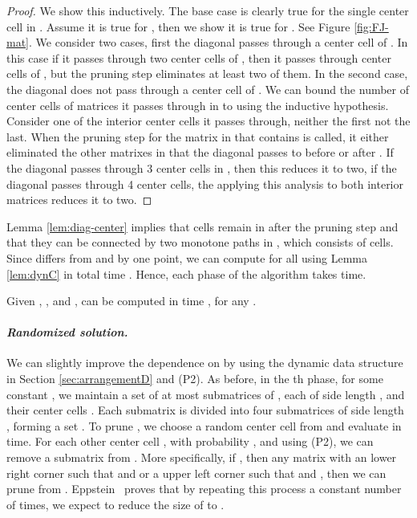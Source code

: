 \documentclass[11pt]{myclass}
\begin{document}
\begin{proof}
We show this inductively.  The base case is clearly true for the single center cell in .  
Assume it is true for , then we show it is true for .  
See Figure \ref{fig:FJ-mat}.
We consider two cases, first the diagonal passes through a center cell of .  
In this case if it passes through two center cells of , then it passes through  center cells of , but the pruning step eliminates at least two of them.  
In the second case, the diagonal does not pass through a center cell of .  We can bound the number of center cells of matrices it passes through in  to  using the inductive hypothesis.  
Consider one of the interior center cells  it passes through, neither the first not the last.  When the pruning step for the matrix in  that contains  is called, it either eliminated the other matrixes in  that the diagonal passes to before or after .  If the diagonal passes through 3 center cells in , then this reduces it to two, if the diagonal passes through 4 center cells, the applying this analysis to both interior matrices reduces it to two.  
\end{proof}

Lemma \ref{lem:diag-center} implies that  cells remain in  after the pruning step and that they can be connected by two monotone paths in , which consists of  cells.
Since  differs from  and  by one point, we can compute  for all  using 
Lemma \ref{lem:dynC} in total time .
Hence, each phase of the algorithm takes  time.  

\begin{lemma}
Given , , and , 
 can be computed in time , for any .  
\end{lemma}


\paragraph{\textbf{\emph{Randomized solution.}}}
We can slightly improve the dependence on  by using the dynamic data structure in Section \ref{sec:arrangementD} and (P2).  
As before, in the th phase, for some constant , we maintain a set  of at most  submatrices of , each of side length , and their center cells .  Each submatrix is divided into four submatrices of side length , forming a set .  To prune , we choose a random center cell  from  and evaluate  in  time.  For each other center cell ,  with probability , and using (P2), we can remove a submatrix from . 
More specifically, if , then any matrix  with an lower right corner  such that  and  or a upper left corner  such that  and , then we can prune  from .  
Eppstein~\cite{Epp97} proves that by repeating this process a constant number of times, we expect to reduce the size of  to .
\end{document}
